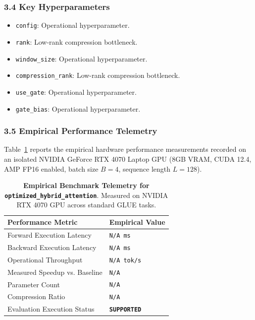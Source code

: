 \subsubsection*{3.4 Key Hyperparameters}
\begin{itemize}
    \item \texttt{config}: Operational hyperparameter.
    \item \texttt{rank}: Low-rank compression bottleneck.
    \item \texttt{window\_size}: Operational hyperparameter.
    \item \texttt{compression\_rank}: Low-rank compression bottleneck.
    \item \texttt{use\_gate}: Operational hyperparameter.
    \item \texttt{gate\_bias}: Operational hyperparameter.
\end{itemize}

\subsubsection*{3.5 Empirical Performance Telemetry}
Table~\ref{tab:telemetry_optimized_hybrid_attention} reports the empirical hardware performance measurements recorded on an isolated NVIDIA GeForce RTX 4070 Laptop GPU (8GB VRAM, CUDA 12.4, AMP FP16 enabled, batch size $B=4$, sequence length $L=128$).

\begin{table}[h]
\centering
\small
\caption{\textbf{Empirical Benchmark Telemetry for \texttt{optimized\_hybrid\_attention}}. Measured on NVIDIA RTX 4070 GPU across standard GLUE tasks.}
\label{tab:telemetry_optimized_hybrid_attention}
\begin{tabularx}{\columnwidth}{lX}
\toprule
\textbf{Performance Metric} & \textbf{Empirical Value} \\
\midrule
Forward Execution Latency & \texttt{N/A ms} \\
Backward Execution Latency & \texttt{N/A ms} \\
Operational Throughput & \texttt{N/A tok/s} \\
Measured Speedup vs. Baseline & \texttt{N/A} \\
Parameter Count & \texttt{N/A} \\
Compression Ratio & \texttt{N/A} \\
Evaluation Execution Status & \textbf{\texttt{SUPPORTED}} \\
\bottomrule
\end{tabularx}
\end{table}

